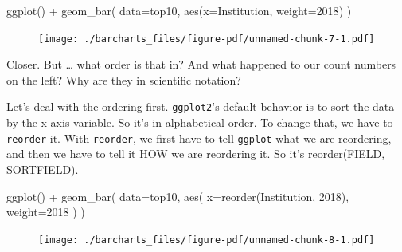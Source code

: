 \documentclass[
  letterpaper,
  DIV=11,
  numbers=noendperiod]{scrreprt}
\newenvironment{Shaded}{\begin{snugshade}}{\end{snugshade}}
\newcommand{\AttributeTok}[1]{\textcolor[rgb]{0.40,0.45,0.13}{#1}}
\newcommand{\FunctionTok}[1]{\textcolor[rgb]{0.28,0.35,0.67}{#1}}
\newcommand{\NormalTok}[1]{\textcolor[rgb]{0.00,0.23,0.31}{#1}}
\newcommand{\SpecialCharTok}[1]{\textcolor[rgb]{0.37,0.37,0.37}{#1}}
\newcommand{\StringTok}[1]{\textcolor[rgb]{0.13,0.47,0.30}{#1}}
\begin{document}
\begin{Shaded}
\begin{Highlighting}[]
\FunctionTok{ggplot}\NormalTok{() }\SpecialCharTok{+} 
  \FunctionTok{geom\_bar}\NormalTok{(}
    \AttributeTok{data=}\NormalTok{top10, }
    \FunctionTok{aes}\NormalTok{(}\AttributeTok{x=}\NormalTok{Institution, }\AttributeTok{weight=}\StringTok{\textasciigrave{}}\AttributeTok{2018}\StringTok{\textasciigrave{}}\NormalTok{)}
\NormalTok{  )}
\end{Highlighting}
\end{Shaded}

\begin{figure}[H]

{\centering \texttt{[image: ./barcharts\_files/figure-pdf/unnamed-chunk-7-1.pdf]}

}

\end{figure}

Closer. But \ldots{} what order is that in? And what happened to our
count numbers on the left? Why are they in scientific notation?

Let's deal with the ordering first. \texttt{ggplot2}'s default behavior
is to sort the data by the x axis variable. So it's in alphabetical
order. To change that, we have to \texttt{reorder} it. With
\texttt{reorder}, we first have to tell \texttt{ggplot} what we are
reordering, and then we have to tell it HOW we are reordering it. So
it's reorder(FIELD, SORTFIELD).

\begin{Shaded}
\begin{Highlighting}[]
\FunctionTok{ggplot}\NormalTok{() }\SpecialCharTok{+} 
  \FunctionTok{geom\_bar}\NormalTok{(}
    \AttributeTok{data=}\NormalTok{top10, }
    \FunctionTok{aes}\NormalTok{(}
      \AttributeTok{x=}\FunctionTok{reorder}\NormalTok{(Institution, }\StringTok{\textasciigrave{}}\AttributeTok{2018}\StringTok{\textasciigrave{}}\NormalTok{), }
      \AttributeTok{weight=}\StringTok{\textasciigrave{}}\AttributeTok{2018}\StringTok{\textasciigrave{}}
\NormalTok{      )}
\NormalTok{    )}
\end{Highlighting}
\end{Shaded}

\begin{figure}[H]

{\centering \texttt{[image: ./barcharts\_files/figure-pdf/unnamed-chunk-8-1.pdf]}

}

\end{figure}
\end{document}
